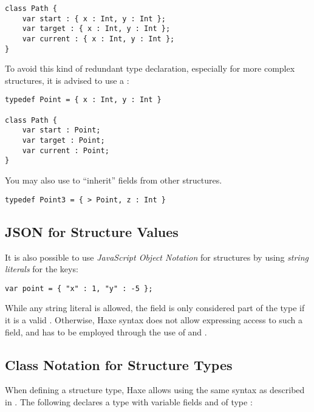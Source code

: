 \begin{lstlisting}
class Path {
    var start : { x : Int, y : Int };
    var target : { x : Int, y : Int };
    var current : { x : Int, y : Int };
}
\end{lstlisting}
To avoid this kind of redundant type declaration, especially for more complex structures, it is advised to use a :

\begin{lstlisting}
typedef Point = { x : Int, y : Int }

class Path {
    var start : Point;
    var target : Point;
    var current : Point;
}
\end{lstlisting}

You may also use  to ``inherit'' fields from other structures.

\begin{lstlisting}
typedef Point3 = { > Point, z : Int }
\end{lstlisting}


\subsection{JSON for Structure Values}
\label{types-structure-json}

It is also possible to use \emph{JavaScript Object Notation} for structures by using \emph{string literals} for the keys:

\begin{lstlisting}
var point = { "x" : 1, "y" : -5 };
\end{lstlisting}
While any string literal is allowed, the field is only considered part of the type if it is a valid . Otherwise, Haxe syntax does not allow expressing access to such a field, and  has to be employed through the use of  and .

\subsection{Class Notation for Structure Types}
\label{types-structure-class-notation}

When defining a structure type, Haxe allows using the same syntax as described in . The following  declares a  type with variable fields  and  of type :

